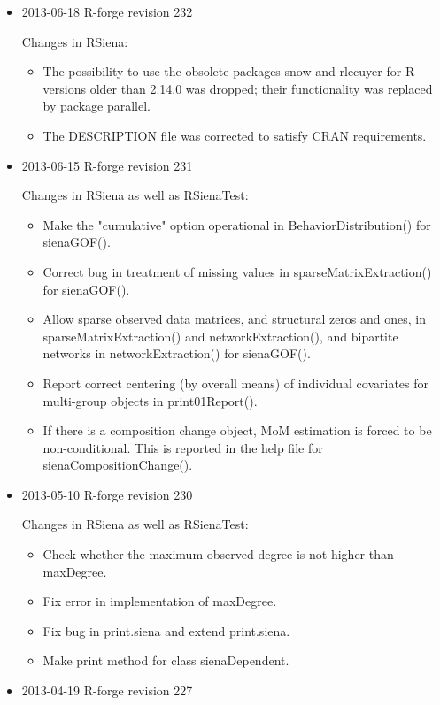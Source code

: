 \documentclass[a4paper,fleqn,11pt]{article}
\newcommand{\+}{\, + \,}
\newcommand{\sfn}[1]{\textsf{#1}}
\begin{document}
{\begin{small}
\begin{itemize}
Changes in RSienaTest:
  \begin{itemize}
  \item Added the parameter reduceg to siena07.
  \end{itemize}

Changes in RSiena and RSienaTest:
  \begin{itemize}
  \item Added effects crprod and inPopIntn for two-mode networks.
  \end{itemize}

\item 2013-06-18 R-forge revision 232

Changes in RSiena:
  \begin{itemize}
  \item The possibility to use the obsolete packages \sfn{snow} and
     \sfn{rlecuyer} for R versions older than 2.14.0 was dropped;
     their functionality was replaced by package \sfn{parallel}.
   \item The DESCRIPTION file was corrected to satisfy CRAN requirements.
  \end{itemize}

\item 2013-06-15 R-forge revision 231

Changes in RSiena as well as RSienaTest:
  \begin{itemize}
  \item
   Make the "cumulative" option operational in \sfn{BehaviorDistribution()}
   for \sfn{sienaGOF()}.
  \item
   Correct bug in treatment of missing values in  \sfn{sparseMatrixExtraction()}
   for  \sfn{sienaGOF()}.
  \item
    Allow sparse observed data matrices, and structural zeros and ones, in
      \sfn{sparseMatrixExtraction()} and  \sfn{networkExtraction()},
     and bipartite networks in  \sfn{networkExtraction()} for  \sfn{sienaGOF()}.
  \item
   Report correct centering (by overall means) of individual
     covariates for multi-group objects in  \sfn{print01Report()}.
  \item
   If there is a composition change object, MoM estimation is forced
     to be non-conditional. This is reported in the help file
     for  \sfn{sienaCompositionChange()}.
  \end{itemize}
\item 2013-05-10 R-forge revision 230

Changes in RSiena as well as RSienaTest:
  \begin{itemize}
   \item Check whether the maximum observed degree is not higher than
     \sfn{maxDegree}.
	\item Fix error in implementation of \sfn{maxDegree}.
	\item Fix bug in \sfn{print.siena} and extend \sfn{print.siena}.
	\item Make print method for class \sfn{sienaDependent}.
  \end{itemize}
\item 2013-04-19 R-forge revision 227


\end{itemize}
\end{small}}
\end{document}
